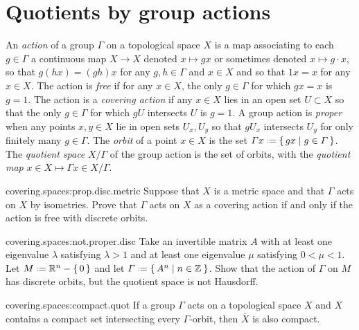 \section{Quotients by group actions}
An \emph{action}%
%
of a group \(\Gamma\) on a topological space \(X\) is a map associating to each \(g \in \Gamma\) a continuous map \(X \to X\) denoted \(x \mapsto gx\) or sometimes denoted \(x \mapsto g \cdot x\), so that \(g(hx)=(gh)x\) for any \(g, h \in \Gamma\) and \(x \in X\) and so that \(1x=x\) for any \(x \in X\).
The action is \emph{free} if for any \(x \in X\), the only \(g \in \Gamma\) for which \(gx=x\) is \(g=1\).
The action is a \emph{covering action}%
%
%
if any \(x \in X\) lies in an open set \(U \subset X\) so that the only \(g \in \Gamma\) for which \(gU\) intersects \(U\) is \(g=1\).
A group action is \emph{proper}%
%
%
when any points \(x, y \in X\) lie in open sets \(U_x, U_y\) so that \(gU_x\) intersects \(U_y\) for only finitely many \(g \in \Gamma\).
The \emph{orbit} of a point \(x \in X\) is the set \(\Gamma x\defeq \set{gx|g \in \Gamma}\).
The \emph{quotient space}%
%
\(X/\Gamma\) of the group action is the set of orbits, with the \emph{quotient map} \(x \in X \mapsto \Gamma x \in X/\Gamma\).
\begin{problem}{covering.spaces:prop.disc.metric}
Suppose that \(X\) is a metric space and that \(\Gamma\) acts on \(X\) by isometries.
Prove that \(\Gamma\) acts on \(X\) as a covering action if and only if the action is free with discrete orbits.
\end{problem}
\begin{problem}{covering.spaces:not.proper.disc}
Take an invertible matrix \(A\) with at least one eigenvalue \(\lambda\) satisfying \(\lambda > 1\) and at least one eigenvalue \(\mu\) satisfying \(0 < \mu < 1\).
Let \(M\defeq \R{n}-\set{0}\) and let \(\Gamma\defeq\set{A^n|n \in \Z{}}\).
Show that the action of \(\Gamma\) on \(M\) has discrete orbits, but the quotient space is not Hausdorff.
\end{problem}
\begin{problem}{covering.spaces:compact.quot}
If a group \(\Gamma\) acts on a topological space \(X\) and
\(X\) contains a compact set intersecting every \(\Gamma\)-orbit, then \(\bar{X}\) is also compact.
\end{problem}
